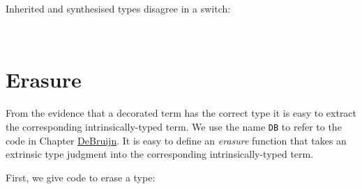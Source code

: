 Inherited and synthesised types disagree in a switch:

\begin{fence}
\begin{code}%
\>[0]\AgdaFunction{\AgdaUnderscore{}}\AgdaSpace{}%
\AgdaSymbol{:}\AgdaSpace{}%
\AgdaSpace{}%
\AgdaSpace{}%
\AgdaSymbol{(((}\AgdaSpace{}%
\AgdaSpace{}%
\AgdaSpace{}%
\AgdaSpace{}%
\AgdaSpace{}%
\AgdaSymbol{)}\AgdaSpace{}%
\AgdaSpace{}%
\AgdaSpace{}%
\AgdaSpace{}%
\AgdaSymbol{(}\AgdaSpace{}%
\AgdaSpace{}%
\AgdaSymbol{)))}\AgdaSpace{}%
\AgdaSpace{}%
\AgdaSpace{}%
\AgdaSymbol{\AgdaUnderscore{}}\<%
\\
\>[0]\AgdaSymbol{\AgdaUnderscore{}}\AgdaSpace{}%
\AgdaSymbol{=}\AgdaSpace{}%
\<%
\end{code}
\end{fence}

\hypertarget{erasure}{%
\section{Erasure}\label{erasure}}

From the evidence that a decorated term has the correct type it is easy
to extract the corresponding intrinsically-typed term. We use the name
\texttt{DB} to refer to the code in Chapter
\protect\hyperlink{DeBruijn}{DeBruijn}. It is easy to define an
\emph{erasure} function that takes an extrinsic type judgment into the
corresponding intrinsically-typed term.

First, we give code to erase a type:

\begin{fence}
\begin{code}%
\>[0]\AgdaSpace{}%
\AgdaSymbol{:}\AgdaSpace{}%
\AgdaSpace{}%
\AgdaSpace{}%
\<%
\\
\>[0]\AgdaSpace{}%
\AgdaSpace{}%
%
\>[21]\AgdaSymbol{=}%
\>[24]\<%
\\
\>[0]\AgdaSpace{}%
\AgdaSpace{}%
\AgdaSpace{}%
\AgdaSpace{}%
%
\>[21]\AgdaSymbol{=}%
\>[24]\AgdaSpace{}%
\AgdaSpace{}%
\AgdaSpace{}%
\AgdaSpace{}%
\AgdaSpace{}%
\AgdaSpace{}%
\<%
\end{code}
\end{fence}

